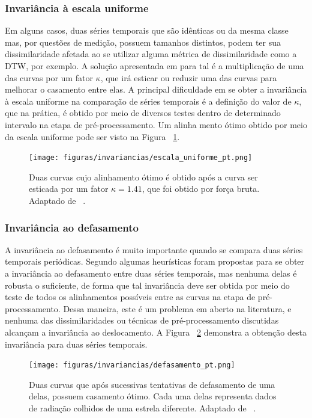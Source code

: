 \subsubsection{Invariância à escala uniforme}

Em alguns casos, duas séries temporais que são idênticas ou da mesma classe mas, por questões de medição, possuem tamanhos distintos, podem ter sua dissimilaridade afetada ao se utilizar alguma métrica de dissimilaridade como a DTW, por exemplo. A solução apresentada em \parencite{CID} para tal é a multiplicação de uma das curvas por um fator $\kappa$, que irá esticar ou reduzir uma das curvas para melhorar o casamento entre elas. A principal dificuldade em se obter a invariância à escala uniforme na comparação de séries temporais é a definição do valor de $\kappa$, que na prática, é obtido por meio de diversos testes dentro de determinado intervalo na etapa de pré-processamento. Um alinha mento ótimo obtido por meio da escala uniforme pode ser visto na Figura ~\ref{fig:inv_escala_uniforme}.

\begin{figure}[h!]
	\texttt{[image: figuras/invariancias/escala\_uniforme\_pt.png]}
	\caption{Duas curvas cujo alinhamento ótimo é obtido após a curva ser esticada por um fator $\kappa=1.41$, que foi obtido por força bruta. Adaptado de ~\parencite{CID}.}
	\label{fig:inv_escala_uniforme}
\end{figure}

\subsubsection{Invariância ao defasamento}

A invariância ao defasamento é muito importante quando se compara duas séries temporais periódicas. Segundo \parencite{CID} algumas heurísticas foram propostas para se obter a invariância ao defasamento entre duas séries temporais, mas nenhuma delas é robusta o suficiente, de forma que tal invariância deve ser obtida por meio do teste de todos os alinhamentos possíveis entre as curvas na etapa de pré-processamento. Dessa maneira, este é um problema em aberto na literatura, e nenhuma das dissimilaridades ou técnicas de pré-processamento discutidas alcançam a invariância ao deslocamento. A Figura ~\ref{fig:inv_defasamento} demonstra a obtenção desta invariância para duas séries temporais.

\begin{figure}[h!]
	\texttt{[image: figuras/invariancias/defasamento\_pt.png]}
	\caption{Duas curvas que após sucessivas tentativas de defasamento de uma delas, possuem casamento ótimo. Cada uma delas representa dados de radiação colhidos de uma estrela diferente. Adaptado de ~\parencite{CID}.}
	\label{fig:inv_defasamento}
\end{figure}

